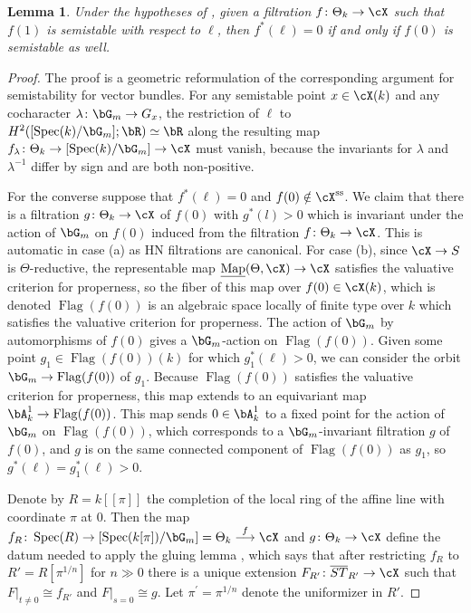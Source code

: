 \documentclass[a4paper]{amsart}
\numberwithin{equation}{section}
\theoremstyle{plain}
\newtheorem{lem}[thm]{Lemma}
\theoremstyle{definition}
\DeclareMathOperator{\Spec}{Spec}
\newcommand{\uMap}{\underline{{\rm Map}}}
\DeclareMathOperator{\Flag}{Flag}
\newcommand{\co}{\colon}
\renewcommand{\ss}{{\rm ss}}
\newcommand{\map}[1]{\stackrel{#1}{\longrightarrow}}
\begin{document}
\begin{lem}\label{L:semistable_filtrations}
Under the hypotheses of , given a filtration $f \co \Theta_k \to \cX$ such that $f(1)$ is semistable with respect to $\ell$, then $f^\ast(\ell) = 0$ if and only if $f(0)$ is semistable as well.
\end{lem}
\begin{proof}
The proof is a geometric reformulation of the corresponding argument for semistability for vector bundles. %
For any semistable point $x \in \cX(k)$ and any cocharacter $\lambda \co \bG_m \to G_x$, the restriction of $\ell$ to $H^2([\Spec(k)/\bG_m];\bR)\simeq \bR$ along the resulting map $f_\lambda \co \Theta_k \to [\Spec(k)/\bG_m] \to \cX$ must vanish, because the invariants for $\lambda$ and $\lambda^{-1}$ differ by sign and are both non-positive. 

For the converse suppose that $f^\ast(\ell)=0$ and $f(0) \notin \cX^{\ss}$.  
We claim that there is a filtration $g \co \Theta_k \to \cX$ of $f(0)$ with $g^*(l) > 0$ which is invariant under the action of $\bG_m$ on $f(0)$ induced from the filtration $f \co \Theta_k \to \cX$.  This is automatic in case (a) as HN filtrations are canonical.  For case (b), since $\cX \to S$ is $\Theta$-reductive,  the representable map $\uMap(\Theta,\cX)\to \cX$ satisfies the valuative criterion for properness, so the fiber of this map over $f(0) \in \cX(k)$, which is denoted $\Flag(f(0))$ is an algebraic space {locally} of finite type over $k$ which satisfies the valuative criterion for properness. The action of $\bG_m$ by automorphisms of $f(0)$ gives a $\bG_m$-action on $\Flag(f(0))$. Given some point $g_1 \in \Flag(f(0))(k)$ for which $g_1^\ast(\ell)>0$, we can consider the orbit $\bG_m \to \Flag(f(0))$ of $g_1$. Because $\Flag(f(0))$ satisfies the valuative criterion for properness, this map extends to an equivariant map $\bA^1_k \to \Flag(f(0))$. This map sends $0 \in \bA^1_k$ to a fixed point for the action of $\bG_m$ on $\Flag(f(0))$, which corresponds to a $\bG_m$-invariant filtration $g$ of $f(0)$, and $g$ is on the same connected component of $\Flag(f(0))$ as $g_1$, so $g^\ast(\ell) = g_1^\ast(\ell) > 0$.



Denote by $R=k[\![\pi]\!]$ the completion of the local ring of the affine line with coordinate $\pi$ at $0$. Then the map $f_R \co \Spec(R) \to [\Spec(k[\pi])/\bG_m] = \Theta_k \map{f} \cX$ and $g \co \Theta_k \to \cX$ define the datum needed to apply the gluing lemma , which says that after restricting $f_R$ to $R' = R[\pi^{1/n}]$ for $n\gg 0$ there is a unique extension $ F_{R'} \co \overline{ST}_{R'} \to \cX$ such that $F|_{t\neq 0} \cong f_{R'}$ and $F|_{s=0}\cong g$. Let $\pi^\prime = \pi^{1/n}$ denote the uniformizer in $R'$.


\end{proof}
\end{document}
